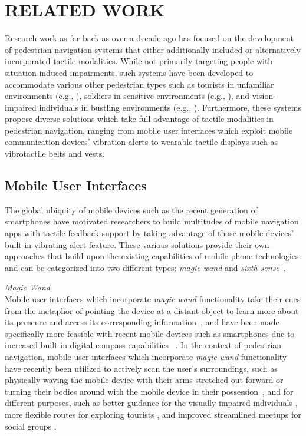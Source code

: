 \documentclass{sigchi}
\begin{document}
\section{RELATED WORK}
Research work as far back as over a decade ago \cite{2000_Ross_ASSETS} has focused on the development of pedestrian navigation systems that either additionally included or alternatively incorporated tactile modalities. While not primarily targeting people with situation-induced impairments, such systems have been developed to accommodate various other pedestrian types such as tourists in unfamiliar environments (e.g., \cite{2012_Pielot_CHI, 2012_Szymczak_MobileHCI}), soldiers in sensitive environments (e.g., \cite{2012_Cummings_CHINZ, 2010_Elliott_IEEEHaptics}), and vision-impaired individuals in bustling environments (e.g., \cite{2006_Johnson_EMBS, 2010_Pielot_Pervasive}). Furthermore, these systems propose diverse solutions which take full advantage of tactile modalities in pedestrian navigation, ranging from mobile user interfaces which exploit mobile communication devices' vibration alerts to wearable tactile displays such as vibrotactile belts and vests.

\subsection{Mobile User Interfaces}
The global ubiquity of mobile devices such as the recent generation of smartphones have motivated researchers to build multitudes of mobile navigation apps with tactile feedback support by taking advantage of those mobile devices' built-in vibrating alert feature.  These various solutions provide their own approaches that build upon the existing capabilities of mobile phone technologies and can be categorized into two different types: \textit{magic wand} and \textit{sixth sense}~\cite{2011_Frohlich_CommunACM}.

\textit{Magic Wand}\\
Mobile user interfaces which incorporate \textit{magic wand} functionality take their cues from the metaphor of pointing the device at a distant object to learn more about its presence and access its corresponding information~\cite{2011_Frohlich_CommunACM}, and have been made specifically more feasible with recent mobile devices such as smartphones due to increased built-in digital compass capabilities ~\cite{2012_Pielot_CHI}. In the context of pedestrian navigation, mobile user interfaces which incorporate \textit{magic wand} functionality have recently been utilized to actively scan the user's surroundings, such as physically waving the mobile device with their arms stretched out forward or turning their bodies around with the mobile device in their possession~\cite{2010_Magnusson_HAID, 2010_Magnusson_MobileHCI}, and for different purposes, such as better guidance for the visually-impaired individuals \cite{2010_Magnusson_NordiCHI}, more flexible routes for exploring tourists \cite{2010_Robinson_MobileHCI}, and improved streamlined meetups for social groups \cite{2010_Williamson_CHI}.
\end{document}
